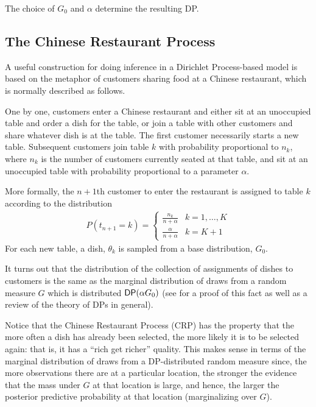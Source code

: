   The choice of $G_0$ and $\alpha$ determine the resulting DP.

  \subsection{The Chinese Restaurant Process}
  \label{sec:chin-rest-proc}

  A useful construction for doing inference in a Dirichlet
  Process-based model is based on the metaphor of customers sharing
  food at a Chinese restaurant, which is normally described as
  follows.

  One by one, customers enter a Chinese restaurant and either sit at
  an unoccupied table and order a dish for the table, or join a table
  with other customers and share whatever dish is at the table.  The first
  customer necessarily starts a new table.  Subsequent customers join
  table $k$ with probability proportional to $n_k$, where $n_k$ is the
  number of customers currently seated at that table, and sit at an
  unoccupied table with probability proportional to a parameter
  $\alpha$.  

  More formally, the $n+1$th customer to enter the restaurant
  is assigned to table $k$ according to the distribution
  \begin{align}
    P(t_{n+1} = k) =
    \begin{cases}
      \frac{n_k}{n + \alpha} & k = 1, \dots, K \\
      \frac{\alpha}{n + \alpha} & k = K + 1
    \end{cases}
  \end{align}
  For each new table, a dish, $\theta_k$ is sampled from a base
  distribution, $G_0$.

  It turns out that the distribution of the collection of 
  assignments of dishes to customers is the same as the marginal
  distribution of draws from a random measure $G$ which is distributed
  $\mathsf{DP}(\alpha G_0)$ (see \citet{teh2011dirichlet} for a proof of this
  fact as well as a review of the theory of DPs in general).

  Notice that the Chinese Restaurant Process (CRP) has the property
  that the more often a dish has already been selected, the more
  likely it is to be selected again: that is, it has a ``rich get
  richer'' quality.  This makes sense in terms of the marginal
  distribution of draws from a DP-distributed random measure since,
  the more observations there are at a particular location, the
  stronger the evidence that the mass under $G$ at that location is
  large, and hence, the larger the posterior predictive probability at
  that location (marginalizing over $G$).

